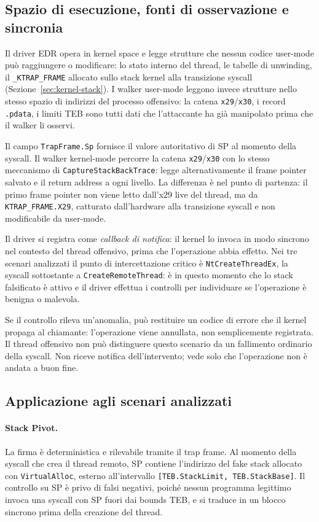 \subsection{Spazio di esecuzione, fonti di osservazione e sincronia}

Il driver EDR opera in kernel space e legge strutture che nessun codice
user-mode può raggiungere o modificare: lo stato interno del thread, le
tabelle di unwinding, il \texttt{\_KTRAP\_FRAME} allocato sullo stack kernel
alla transizione syscall (Sezione~\ref{sec:kernel-stack}). I walker user-mode
leggono invece strutture nello stesso spazio di indirizzi del processo
offensivo: la catena \texttt{x29}/\texttt{x30}, i record \texttt{.pdata}, i
limiti TEB sono tutti dati che l'attaccante ha già manipolato prima che il
walker li osservi.

Il campo \texttt{TrapFrame.Sp} fornisce il valore autoritativo di SP al
momento della syscall. Il walker kernel-mode percorre la catena
\texttt{x29}/\texttt{x30} con lo stesso meccanismo di
\texttt{CaptureStackBackTrace}: legge alternativamente il frame pointer
salvato e il return address a ogni livello. La differenza è nel punto di
partenza: il primo frame pointer non viene letto dall'x29 live del thread,
ma da \texttt{KTRAP\_FRAME.X29}, catturato dall'hardware alla transizione
syscall e non modificabile da user-mode.

Il driver si registra come \emph{callback di notifica}: il kernel lo invoca
in modo sincrono nel contesto del thread offensivo, prima che l'operazione
abbia effetto. Nei tre scenari analizzati il punto di intercettazione
critico è \texttt{NtCreateThreadEx}, la syscall sottostante a
\texttt{CreateRemoteThread}: è in questo momento che lo stack falsificato è
attivo e il driver effettua i controlli per individuare se l'operazione è
benigna o malevola.

Se il controllo rileva un'anomalia, può restituire un codice di errore che il
kernel propaga al chiamante: l'operazione viene annullata, non semplicemente
registrata. Il thread offensivo non può distinguere questo scenario da un
fallimento ordinario della syscall. Non riceve notifica dell'intervento; vede
solo che l'operazione non è andata a buon fine.

\subsection{Applicazione agli scenari analizzati}

\paragraph{Stack Pivot.}
La firma è deterministica e rilevabile tramite il trap frame. Al momento della
syscall che crea il thread remoto, SP contiene l'indirizzo del fake stack
allocato con \texttt{VirtualAlloc}, esterno all'intervallo
\texttt{[TEB.StackLimit, TEB.StackBase]}. Il controllo su SP è privo di falsi
negativi, poiché nessun programma legittimo invoca una syscall con SP fuori
dai bounds TEB, e si traduce in un blocco sincrono prima della creazione del
thread.

